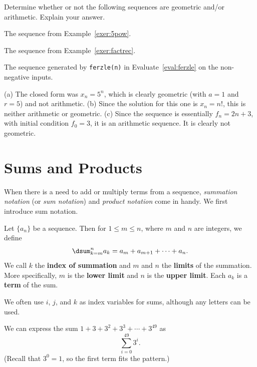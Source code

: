 \newpage %
 
\begin{ques}
Determine whether or not the following sequences are geometric and/or arithmetic.
Explain your answer.
\begin{lenum}
\item
The sequence from Example~\ref{exer:5pow}.

\noindent 
\answerlinetwo
\item
The sequence from Example~\ref{exer:factrec}.

\noindent 
\answerlinetwo
\item
The sequence generated by \verb+ferzle(n)+ in Evaluate~\ref{eval:ferzle} 
on the non-negative inputs.

\noindent 
\answerlinetwo
\end{lenum}
\begin{answer}
(a) The closed form was $x_n=5^n$, which is clearly geometric (with $a=1$ and $r=5$) and not arithmetic.
(b) Since the solution for this one is $x_n=n!$, this is neither arithmetic or geometric.
(c) Since the sequence is essentially $f_n=2n+3$, with initial condition $f_0=3$, it is an
arithmetic sequence.  It is clearly not geometric.
\end{answer}
\end{ques}

\newpage

\section{Sums and Products}\label{section:sumProd}
When there is a need to add or multiply terms from a sequence, {\em summation notation} (or {\em sum notation})
and {\em product notation} come in handy.  We first introduce sum notation.

\begin{df}
Let $\{a_n\}$ be a sequence.  Then for $1\leq m\leq n$, where $m$ and $n$ are integers,
we define
$$\dsum _{k=m} ^n a_k=a_m+a_{m+1}+\cdots + a_n.$$
We call $k$ the {\bf index of summation} and $m$ and $n$ the {\bf limits} of the summation.
More specifically, $m$ is the {\bf lower limit} and $n$ is the {\bf upper limit}.
Each $a_k$ is a {\bf term} of the sum.
\end{df}

\begin{rem}
We often use $i$, $j$, and $k$ as index variables for sums, although
any letters can be used.
\end{rem}
\begin{exa}
We can express the sum $1 + 3 + 3^2 + 3^3 + \cdots + 3^{49}$ as
$$\sum_{i=0}^{49} 3^i.$$
(Recall that $3^0=1$, so the first term fits the pattern.)
\end{exa}

